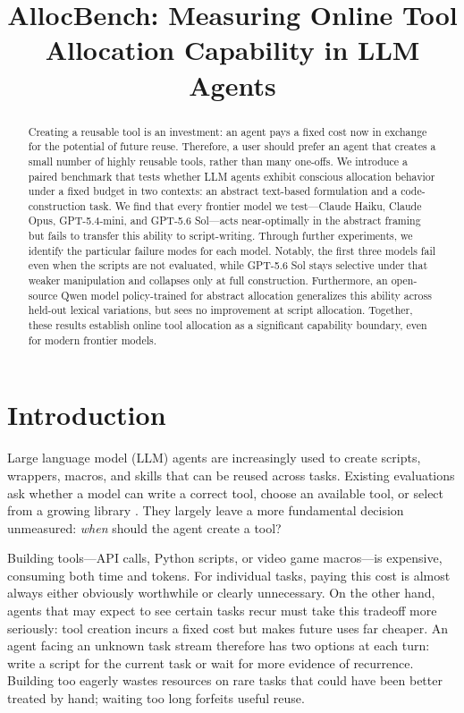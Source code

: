 \documentclass{article}
\title{AllocBench: Measuring Online Tool Allocation Capability in LLM Agents}
\author{%
\makebox[\textwidth]{%
\begin{tabular}[t]{c}
Daniel Wang\thanks{These authors contributed equally to this paper.} \\
Yale University \\
\texttt{daniel.wang.dzw22@yale.edu}
\end{tabular}
\hspace{0.08\textwidth}
\begin{tabular}[t]{c}
Andrew Xu\footnotemark[1] \\
Yale University \\
\texttt{andrew.xu.ax59@yale.edu}
\end{tabular}%
}}
\begin{document}
\maketitle
\begin{abstract}
Creating a reusable tool is an investment: an agent pays a fixed cost now in
exchange for the potential of future reuse. Therefore, a user should prefer an agent that creates a small number of highly reusable tools, rather than many one-offs. We introduce a paired benchmark that tests whether LLM agents exhibit conscious allocation behavior under a fixed budget in two contexts: an abstract text-based formulation and a code-construction task. We find that every frontier model we test---Claude Haiku, Claude Opus, GPT-5.4-mini, and GPT-5.6 Sol---acts near-optimally in the abstract framing but fails to transfer this ability to script-writing. Through further experiments, we
identify the particular failure modes for each model. Notably, the first three models fail even when the scripts are not evaluated, while GPT-5.6 Sol stays selective under that weaker manipulation and collapses only at full construction. Furthermore, an open-source Qwen model policy-trained for abstract allocation generalizes this ability across held-out lexical
variations, but sees no improvement at script allocation.
Together, these results establish online tool allocation as a significant
capability boundary, even for modern frontier models.
\end{abstract}

\section{Introduction}

Large language model (LLM) agents are increasingly used to create scripts, wrappers, macros, and skills that can be reused across tasks. Existing evaluations ask whether a model can
write a correct tool, choose an available tool, or select from a growing
library \citep{cai2024latm,qian2023creator,huang2024ultratool,qu2025toollearningsurvey}. 
They largely leave a more fundamental decision unmeasured: \emph{when} should the agent create a tool? 

Building tools---API calls, Python scripts, or video game macros---is expensive, consuming both time and tokens. For individual tasks, paying this cost is almost always either obviously worthwhile or clearly unnecessary. On the other hand, agents that may expect to see certain tasks recur must take this tradeoff more seriously: tool creation incurs a fixed cost but makes future uses far cheaper. An agent facing an unknown task stream therefore has two
options at each turn: write a script for the current task or wait for more evidence of recurrence. Building too eagerly wastes resources on rare tasks that could have been better treated by hand; waiting too long forfeits useful reuse. 
\end{document}
